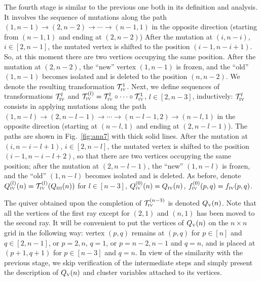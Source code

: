 \documentclass{amsart}
\theoremstyle{definition}
\theoremstyle{remark}
\numberwithin{equation}{section}
\numberwithin{theorem}{section}
\begin{document}
The fourth stage is similar to the previous one both in its definition and analysis. 
It involves the sequence of mutations  along the path $(1,n-1)\to (2,n-2)\to \cdots \to
 (n-1,1)$ in the opposite direction (starting from $(n-1,1)$ and ending at $(2,n-2)$) 
 After the mutation at
 $(i,n-i)$, $i\in[2,n-1]$, the mutated vertex is shifted  to the position $(i-1,n-i+1)$. So, at this 
 moment there are two vertices occupying the same position. 
 After the mutation at $(2,n-2)$, the ``new'' vertex $(1,n-1)$ is frozen,
and  the ``old'' $(1,n-1)$ becomes isolated and is deleted
 to the position $(n,n-2)$.
We denote the resulting transformation ${{\mathcal T}}^{1}_{\mbox{\tiny\rm IV}}$. 
 Next, we define sequences of transformations
 ${{\mathcal T}}^{l}_{\mbox{\tiny\rm IV}}$ and $ {{\mathcal T}}^{(l)}_{\mbox{\tiny\rm IV}} = {{\mathcal T}}^{l}_{\mbox{\tiny\rm IV}}\circ\cdots\circ {{\mathcal T}}^{1}_{\mbox{\tiny\rm IV}}$, $l\in[2,n-3]$, inductively: ${{\mathcal T}}^{l}_{\mbox{\tiny\rm IV}}$ consists 
 in applying mutations along the path $(1,n-l)\to (2,n-l-1)\to \cdots
 \to (n-l-1,2)\to (n-l,1)$ in the opposite direction (starting at $(n-l,1)$ and ending at 
 $(2,n-l-1)$). The paths are shown in Fig.~\ref{fig:ann7} with thick solid lines. 
 After the mutation
 at  $(i,n-i-l+1)$, $i\in [2, n-l]$, the mutated vertex is shifted to the position $(i-1,n-i-l+2)$, so that there are 
 two vertices occupying the same position; after the mutation at $(2,n-l-1)$, the ``new'' $(1,n-l)$ is frozen,  
and the ``old'' $(1,n-l)$ becomes isolated and is deleted. As before, denote 
 $Q^{(l)}_{\mbox{\tiny\rm IV}}(n)={{\mathcal T}}^{(l)}_{\mbox{\tiny\rm IV}}(Q_{\mbox{\tiny\rm III}}(n))$ for $l\in [n-3]$, $Q^{(0)}_{\mbox{\tiny\rm IV}}(n)=Q_{\mbox{\tiny\rm IV}}(n)$, $f^{(0)}_{\mbox{\tiny\rm IV}}(p,q)=f_{\mbox{\tiny\rm IV}}(p,q)$.

 
The quiver obtained upon the completion of ${{\mathcal T}}^{(n-3)}_{\mbox{\tiny\rm IV}}$ is denoted $Q_{\mbox{\tiny\rm V}}(n)$. 
Note that all the vertices of the first ray except for $(2,1)$ and $(n,1)$ has been moved to the 
second ray. It will be convenient
to put the vertices of $Q_{\mbox{\tiny\rm V}}(n)$ on the $n\times n$ grid in the following way: 
vertex $(p,q)$ remains at
$(p, q)$ for $p\in [n]$ and $q\in [2,n-1]$, or $p=2,n$, $q=1$, or $p=n-2,n-1$ and $q=n$, and
is placed at $(p+1,q+1)$ for $p\in[n-3]$ and $q=n$.   
In view of the similarity with the previous stage, we skip verification of the intermediate steps and 
simply present the description of $Q_{\mbox{\tiny\rm V}}(n)$ and cluster variables attached to its vertices.
 
\end{document}
